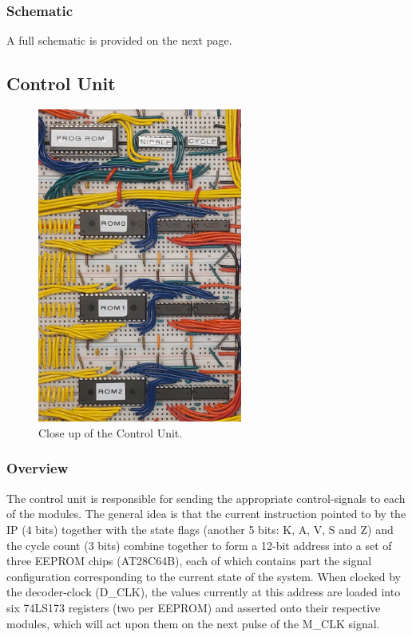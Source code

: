 \subsubsection{Schematic}
A full schematic is provided on the next page.




\subsection{Control Unit}\label{sec:implementation:cu}
\begin{figure}[H]
  \centering
  \includegraphics[width=0.6\textwidth]{img/controlunitcloseup}
  \caption{Close up of the Control Unit.}
  \label{fig:controlunitcloseup}
\end{figure}

\subsubsection{Overview}
The control unit is responsible for sending the appropriate control-signals to each of the modules. The general idea is that the current instruction pointed to by the IP (4 bits) together with the state flags (another 5 bits: K, A, V, S and Z) and the cycle count (3 bits) combine together to form a 12-bit address into a set of three EEPROM chips (AT28C64B), each of which contains part the signal configuration corresponding to the current state of the system. When clocked by the decoder-clock (D\_CLK), the values currently at this address are loaded into six 74LS173 registers (two per EEPROM) and asserted onto their respective modules, which will act upon them on the next pulse of the M\_CLK signal.

